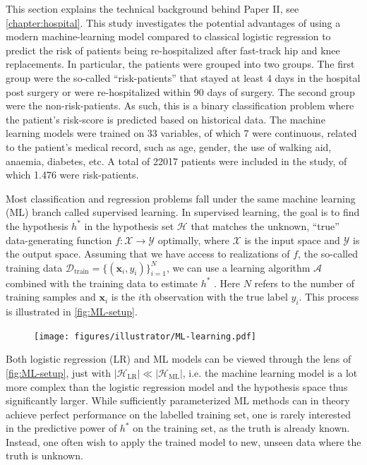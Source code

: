 
This section explains the technical background behind Paper II, see \autoref{chapter:hospital}. This study investigates the potential advantages of using a modern machine-learning model compared to classical logistic regression to predict the risk of patients being re-hospitalized after fast-track hip and knee replacements. In particular, the patients were grouped into two groups. The first group were the so-called ``risk-patients'' that stayed at least 4 days in the hospital post surgery or were re-hospitalized within 90 days of surgery. The second group were the non-risk-patients. As such, this is a binary classification problem where the patient's risk-score is predicted based on historical data. The machine learning models were trained on 33 variables, of which 7 were continuous, related to the patient's medical record, such as age, gender, the use of walking aid, anaemia, diabetes, etc. A total of 22017 patients were included in the study, of which 1.476 were risk-patients.


Most classification and regression problems fall under the same machine learning (ML) branch called supervised learning. In supervised learning, the goal is to find the hypothesis $h^*$ in the hypothesis set $\mathcal{H}$ that matches the unknown, ``true'' data-generating function $f: \mathcal{X} \rightarrow \mathcal{Y}$ optimally, where $\mathcal{X}$ is the input space and $\mathcal{Y}$ is the output space. Assuming that we have access to realizations of $f$, the so-called training data $\mathcal{D}_\mathrm{train} = \{(\mathbf{x}_i, y_i)\}_{i=1}^N$, we can use a learning algorithm $\mathcal{A}$ combined with the training data to estimate $h^*$ \autocite{abu-mostafaLearningData2012a}. Here $N$ refers to the number of training samples and $\mathbf{x}_i$ is the $i$th observation with the true label $y_i$. This process is illustrated in \autoref{fig:ML-setup}.

\begin{figure}[htbp]
    \centering
    \texttt{[image: figures/illustrator/ML-learning.pdf]}
\end{figure}

Both logistic regression (LR) and ML models can be viewed through the lens of \autoref{fig:ML-setup}, just with $|\mathcal{H}_\mathrm{LR}| \ll |\mathcal{H}_\mathrm{ML}|$, i.e. the machine learning model is a lot more complex than the logistic regression model and the hypothesis space thus significantly larger. While sufficiently parameterized ML methods can in theory achieve perfect performance on the labelled training set, one is rarely interested in the predictive power of $h^*$ on the training set, as the truth is already known. Instead, one often wish to apply the trained model to new, unseen data where the truth is unknown.

